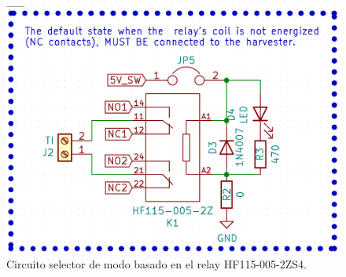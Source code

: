 \begin{figure}[h]
	\centering
	\includegraphics[width=0.8\linewidth]{Figures/cto_seleccion_de_modo}
	\caption{Circuito selector de modo basado en el relay HF115-005-2ZS4.}
	\label{fig:ctoselecciondemodo}
\end{figure}\\

\vspace{10px}

